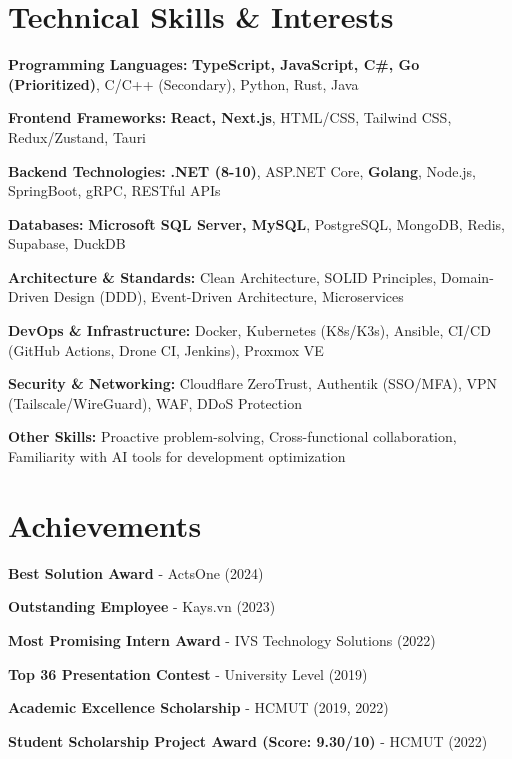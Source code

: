 \section{Technical Skills \& Interests}
\begin{onecolentry}
\begin{highlights}
    \item \textbf{Programming Languages:} \textbf{TypeScript, JavaScript, C\#, Go (Prioritized)}, C/C++ (Secondary), Python, Rust, Java
    \item \textbf{Frontend Frameworks:} \textbf{React, Next.js}, HTML/CSS, Tailwind CSS, Redux/Zustand, Tauri
    \item \textbf{Backend Technologies:} \textbf{.NET (8-10)}, ASP.NET Core, \textbf{Golang}, Node.js, SpringBoot, gRPC, RESTful APIs
    \item \textbf{Databases:} \textbf{Microsoft SQL Server, MySQL}, PostgreSQL, MongoDB, Redis, Supabase, DuckDB
    \item \textbf{Architecture \& Standards:} Clean Architecture, SOLID Principles, Domain-Driven Design (DDD), Event-Driven Architecture, Microservices
    \item \textbf{DevOps \& Infrastructure:} Docker, Kubernetes (K8s/K3s), Ansible, CI/CD (GitHub Actions, Drone CI, Jenkins), Proxmox VE
    \item \textbf{Security \& Networking:} Cloudflare ZeroTrust, Authentik (SSO/MFA), VPN (Tailscale/WireGuard), WAF, DDoS Protection
    \item \textbf{Other Skills:} Proactive problem-solving, Cross-functional collaboration, Familiarity with AI tools for development optimization
\end{highlights}
\end{onecolentry}

\section{Achievements}
\begin{onecolentry}
    \begin{highlights}
        \item \textbf{Best Solution Award} - ActsOne (2024)
        \item \textbf{Outstanding Employee} - Kays.vn (2023)
        \item \textbf{Most Promising Intern Award} - IVS Technology Solutions (2022)
        \item \textbf{Top 36 Presentation Contest} - University Level (2019)
        \item \textbf{Academic Excellence Scholarship} - HCMUT (2019, 2022)
        \item \textbf{Student Scholarship Project Award (Score: 9.30/10)} - HCMUT (2022)
    \end{highlights}
\end{onecolentry}
